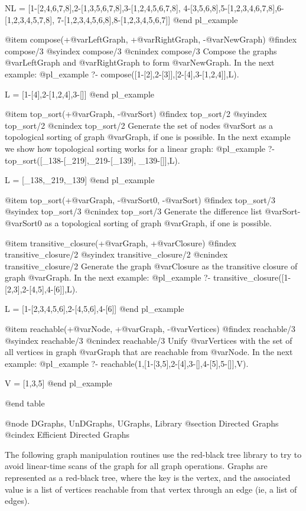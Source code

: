 NL = [1-[2,4,6,7,8],2-[1,3,5,6,7,8],3-[1,2,4,5,6,7,8],
      4-[3,5,6,8],5-[1,2,3,4,6,7,8],6-[1,2,3,4,5,7,8],
      7-[1,2,3,4,5,6,8],8-[1,2,3,4,5,6,7]]
@end pl_example

@item compose(+@var{LeftGraph}, +@var{RightGraph}, -@var{NewGraph})
@findex  compose/3
@syindex compose/3
@cnindex compose/3
Compose the graphs @var{LeftGraph} and @var{RightGraph} to form @var{NewGraph}.
 In the next example:
@pl_example
?- compose([1-[2],2-[3]],[2-[4],3-[1,2,4]],L).

L = [1-[4],2-[1,2,4],3-[]]
@end pl_example

@item top_sort(+@var{Graph}, -@var{Sort})
@findex  top_sort/2
@syindex top_sort/2
@cnindex top_sort/2
Generate the set of nodes @var{Sort} as a topological sorting of graph
@var{Graph}, if one is possible.
 In the next example we show how topological sorting works for a linear graph:
@pl_example
?- top_sort([_138-[_219],_219-[_139], _139-[]],L).

L = [_138,_219,_139]
@end pl_example

@item top_sort(+@var{Graph}, -@var{Sort0}, -@var{Sort})
@findex  top_sort/3
@syindex top_sort/3
@cnindex top_sort/3
Generate the difference list @var{Sort}-@var{Sort0} as a topological
sorting of graph @var{Graph}, if one is possible.

@item transitive_closure(+@var{Graph}, +@var{Closure})
@findex  transitive_closure/2
@syindex transitive_closure/2
@cnindex transitive_closure/2
Generate the graph @var{Closure} as the transitive closure of graph
@var{Graph}.
 In the next example:
@pl_example
?- transitive_closure([1-[2,3],2-[4,5],4-[6]],L).

L = [1-[2,3,4,5,6],2-[4,5,6],4-[6]]
@end pl_example

@item reachable(+@var{Node}, +@var{Graph}, -@var{Vertices})
@findex  reachable/3
@syindex reachable/3
@cnindex reachable/3
Unify @var{Vertices} with the set of all vertices in graph
@var{Graph} that are reachable from @var{Node}. In the next example:
@pl_example
?- reachable(1,[1-[3,5],2-[4],3-[],4-[5],5-[]],V).

V = [1,3,5]
@end pl_example

@end table

@node DGraphs, UnDGraphs, UGraphs, Library
@section Directed Graphs
@cindex Efficient Directed Graphs

The following graph manipulation routines use the red-black tree library
to try to avoid linear-time scans of the graph for all graph
operations. Graphs are represented as a red-black tree, where the key is
the vertex, and the associated value is a list of vertices reachable
from that vertex through an edge (ie, a list of edges). 

